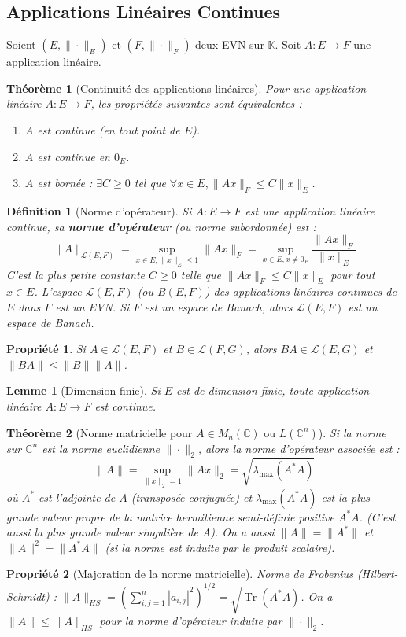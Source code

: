 \documentclass[a4paper]{article}
\newcommand{\C}{\mathbb{C}} %
\newcommand{\K}{\mathbb{K}} %
\newtheorem{theorem}{Théorème}[section]
\newtheorem{definition}{Définition}[section]
\newtheorem{lemma}{Lemme}[section] %
\newtheorem{propriete}{Propriété}[section] %
\begin{document}
\subsection{Applications Linéaires Continues}
Soient \((E, \|\cdot\|_E)\) et \((F, \|\cdot\|_F)\) deux EVN sur \(\K\). Soit \(A: E \to F\) une application linéaire.
\begin{theorem}[Continuité des applications linéaires]
    Pour une application linéaire \(A: E \to F\), les propriétés suivantes sont équivalentes :
    \begin{enumerate}
        \item \(A\) est continue (en tout point de \(E\)).
        \item \(A\) est continue en \(0_E\).
        \item \(A\) est bornée : \(\exists C \ge 0\) tel que \(\forall x \in E, \|Ax\|_F \le C \|x\|_E\).
    \end{enumerate}
\end{theorem}
\begin{definition}[Norme d'opérateur]
    Si \(A: E \to F\) est une application linéaire continue, sa \textbf{norme d'opérateur} (ou norme subordonnée) est :
    \[ \|A\|_{\mathcal{L}(E,F)} = \sup_{x \in E, \|x\|_E \le 1} \|Ax\|_F = \sup_{x \in E, x \neq 0_E} \frac{\|Ax\|_F}{\|x\|_E} \]
    C'est la plus petite constante \(C \ge 0\) telle que \(\|Ax\|_F \le C \|x\|_E\) pour tout \(x \in E\).
    L'espace \(\mathcal{L}(E,F)\) (ou \(B(E,F)\)) des applications linéaires continues de \(E\) dans \(F\) est un EVN. Si \(F\) est un espace de Banach, alors \(\mathcal{L}(E,F)\) est un espace de Banach.
\end{definition}
\begin{propriete}
    Si \(A \in \mathcal{L}(E,F)\) et \(B \in \mathcal{L}(F,G)\), alors \(BA \in \mathcal{L}(E,G)\) et \(\|BA\| \le \|B\| \|A\|\).
\end{propriete}
\begin{lemma}[Dimension finie]
    Si \(E\) est de dimension finie, toute application linéaire \(A: E \to F\) est continue.
\end{lemma}
\begin{theorem}[Norme matricielle pour \(A \in M_n(\C)\) ou \(L(\C^n)\)]
    Si la norme sur \(\C^n\) est la norme euclidienne \(\|\cdot\|_2\), alors la norme d'opérateur associée est :
    \[ \|A\| = \sup_{\|x\|_2=1} \|Ax\|_2 = \sqrt{\lambda_{\max}(A^*A)} \]
    où \(A^*\) est l'adjointe de \(A\) (transposée conjuguée) et \(\lambda_{\max}(A^*A)\) est la plus grande valeur propre de la matrice hermitienne semi-définie positive \(A^*A\). (C'est aussi la plus grande valeur singulière de A).
    On a aussi \(\|A\| = \|A^*\|\) et \(\|A\|^2 = \|A^*A\|\) (si la norme est induite par le produit scalaire).
\end{theorem}
\begin{propriete}[Majoration de la norme matricielle]
    Norme de Frobenius (Hilbert-Schmidt) : \(\|A\|_{HS} = \left( \sum_{i,j=1}^n |a_{i,j}|^2 \right)^{1/2} = \sqrt{\operatorname{Tr}(A^*A)}\).
    On a \(\|A\| \le \|A\|_{HS}\) pour la norme d'opérateur induite par \(\|\cdot\|_2\).
\end{propriete}
\end{document}
